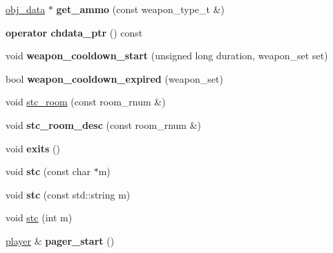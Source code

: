 \begin{DoxyCompactItemize}
\item 
\mbox{\label{classmods_1_1player_a34994ab035cac45f4d91f99a11e13306}} 
\hyperlink{structobj__data}{obj\+\_\+data} $\ast$ {\bfseries get\+\_\+ammo} (const weapon\+\_\+type\+\_\+t \&)
\item 
\mbox{\label{classmods_1_1player_ae42a701bdd5d5fb46d7658cad6161464}} 
{\bfseries operator chdata\+\_\+ptr} () const
\item 
\mbox{\label{classmods_1_1player_a70937219529a099fba3933cfca8cfa8a}} 
void {\bfseries weapon\+\_\+cooldown\+\_\+start} (unsigned long duration, weapon\+\_\+set set)
\item 
\mbox{\label{classmods_1_1player_a2489270f0eeb5e26ec509dcb75cd8bb4}} 
bool {\bfseries weapon\+\_\+cooldown\+\_\+expired} (weapon\+\_\+set)
\item 
void \hyperlink{classmods_1_1player_a05030c2c9439f95c84704ed6f7c993d1}{stc\+\_\+room} (const room\+\_\+rnum \&)
\item 
\mbox{\label{classmods_1_1player_a6195057ece7899142c460e5322498a4a}} 
void {\bfseries stc\+\_\+room\+\_\+desc} (const room\+\_\+rnum \&)
\item 
\mbox{\label{classmods_1_1player_a87f149291db4a0a6b50ce9fbb8cd240e}} 
void {\bfseries exits} ()
\item 
\mbox{\label{classmods_1_1player_a550769bddbe79e5086130df7deef07f7}} 
void {\bfseries stc} (const char $\ast$m)
\item 
\mbox{\label{classmods_1_1player_a0aaa555bf45fb81f83a08e083f28fac1}} 
void {\bfseries stc} (const std\+::string m)
\item 
void \hyperlink{classmods_1_1player_a3d00ca11aeb86fa14ed502a661b84d9a}{stc} (int m)
\item 
\mbox{\label{classmods_1_1player_abcda2912465c7b7cff614713479566d9}} 
\hyperlink{classmods_1_1player}{player} \& {\bfseries pager\+\_\+start} ()
\item 
\mbox{\label{classmods_1_1player_a99719cb878a864ca37d04834d0ed96ad}} 

\end{DoxyCompactItemize}
